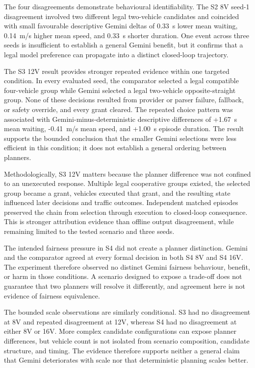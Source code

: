 \documentclass[letterpaper,10pt,conference]{ieeeconf}
\begin{document}
The four disagreements demonstrate behavioural identifiability. The S2 8V seed-1 disagreement involved two different legal two-vehicle candidates and coincided with small favourable descriptive Gemini deltas of 0.33~s lower mean waiting, 0.14~m/s higher mean speed, and 0.33~s shorter duration. One event across three seeds is insufficient to establish a general Gemini benefit, but it confirms that a legal model preference can propagate into a distinct closed-loop trajectory.



The S3 12V result provides stronger repeated evidence within one targeted condition. In every evaluated seed, the comparator selected a legal compatible four-vehicle group while Gemini selected a legal two-vehicle opposite-straight group. None of these decisions resulted from provider or parser failure, fallback, or safety override, and every grant cleared. The repeated choice pattern was associated with Gemini-minus-deterministic descriptive differences of +1.67~s mean waiting, -0.41~m/s mean speed, and +1.00~s episode duration. The result supports the bounded conclusion that the smaller Gemini selections were less efficient in this condition; it does not establish a general ordering between planners.



Methodologically, S3 12V matters because the planner difference was not confined to an unexecuted response. Multiple legal cooperative groups existed, the selected group became a grant, vehicles executed that grant, and the resulting state influenced later decisions and traffic outcomes. Independent matched episodes preserved the chain from selection through execution to closed-loop consequence. This is stronger attribution evidence than offline output disagreement, while remaining limited to the tested scenario and three seeds.



The intended fairness pressure in S4 did not create a planner distinction. Gemini and the comparator agreed at every formal decision in both S4 8V and S4 16V. The experiment therefore observed no distinct Gemini fairness behaviour, benefit, or harm in those conditions. A scenario designed to expose a trade-off does not guarantee that two planners will resolve it differently, and agreement here is not evidence of fairness equivalence.



The bounded scale observations are similarly conditional. S3 had no disagreement at 8V and repeated disagreement at 12V, whereas S4 had no disagreement at either 8V or 16V. More complex candidate configurations can expose planner differences, but vehicle count is not isolated from scenario composition, candidate structure, and timing. The evidence therefore supports neither a general claim that Gemini deteriorates with scale nor that deterministic planning scales better.
\end{document}
